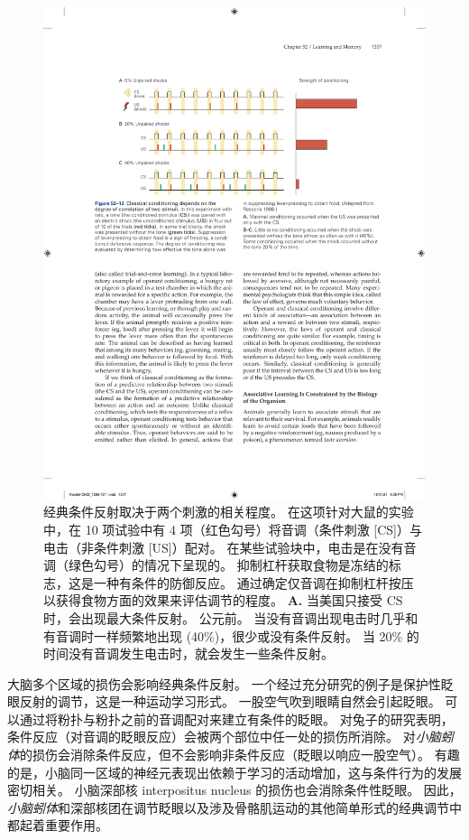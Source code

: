 \begin{figure}[htbp]
	\centering
	\includegraphics[width=0.8\linewidth]{chap52/fig_52_12}
	\caption{经典条件反射取决于两个刺激的相关程度。
		在这项针对大鼠的实验中，在 10 项试验中有 4 项（红色勾号）将音调（条件刺激 [CS]）与电击（非条件刺激 [US]）配对。
		在某些试验块中，电击是在没有音调（绿色勾号）的情况下呈现的。
		抑制杠杆获取食物是冻结的标志，这是一种有条件的防御反应。
		通过确定仅音调在抑制杠杆按压以获得食物方面的效果来评估调节的程度\cite{rescorla1968probability}。
		\textbf{A.} 当美国只接受 CS 时，会出现最大条件反射。 公元前。
		当没有音调出现电击时几乎和有音调时一样频繁地出现 (40\%)，很少或没有条件反射。
		当 20\% 的时间没有音调发生电击时，就会发生一些条件反射。}
	\label{fig:52_12}
\end{figure}


大脑多个区域的损伤会影响经典条件反射。
一个经过充分研究的例子是保护性眨眼反射的调节，这是一种运动学习形式。
一股空气吹到眼睛自然会引起眨眼。
可以通过将粉扑与粉扑之前的音调配对来建立有条件的眨眼。
对兔子的研究表明，条件反应（对音调的眨眼反应）会被两个部位中任一处的损伤所消除。
对\textit{小脑蚓体}的损伤会消除条件反应，但不会影响非条件反应（眨眼以响应一股空气）。
有趣的是，小脑同一区域的神经元表现出依赖于学习的活动增加，这与条件行为的发展密切相关。
小脑深部核 interpositus nucleus 的损伤也会消除条件性眨眼。
因此，\textit{小脑蚓体}和深部核团在调节眨眼以及涉及骨骼肌运动的其他简单形式的经典调节中都起着重要作用。


